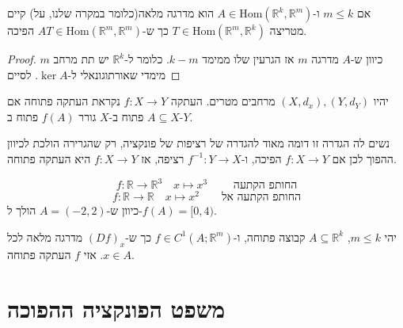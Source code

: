 \documentclass{tstextbook}
\begin{document}
\begin{lemma}
אם \(m\leq k\) ו-\(A\in\mathrm{Hom}\left( \mathbb{R}^k,\mathbb{R}^m \right)\) הוא מדרגה מלאה(כלומר במקרה שלנו, על) קיים מטריצה \(T\in\mathrm{Hom}\left( \mathbb{R}^m,\mathbb{R}^k \right)\) כך ש-\(AT\in\mathrm{Hom}\left( \mathbb{R}^m,\mathbb{R}^m \right)\) הפיכה.

\end{lemma}
\begin{proof}
כיוון ש-\(A\) מדרגה \(m\) אז הגרעין שלו ממימד \(k-m\). כלומר ל-\(\mathbb{R}^k\) יש תת מרחב \(m\) מימדי שאורתוגונאלי ל-\(\ker A\).
לסיים

\end{proof}
\begin{definition}
יהיו \((X,d_{x}),(Y,d_{Y})\) מרחבים מטרים. העתקה \(f:X\to Y\) נקראת העתקה פתוחה
אם \(A\subseteq X\) פתוח ב-\(X\) גורר \(f(A)\) פתוח ב-\(Y\).

\end{definition}
\begin{remark}
נשים לה הגדרה זו דומה מאוד להגדרה של רציפות של פונקציה, רק שהגרירה הולכת לכיוון ההפוך לכן אם \(f:X\to Y\) הפיכה, ו-\(f^{-1}:Y\to X\) רציפה, אז \(f:X\to Y\) היא העתקה פתוחה.

\end{remark}
\begin{example}
$$f:\mathbb{R}\to \mathbb{R}^3\quad x\mapsto x^3\qquad  \text{ החותפ הקתעה}$$$$f:\mathbb{R}\to\mathbb{R}\quad x\mapsto x^2 \qquad \text{החותפ הקתעה אל}$$
כיוון ש-\(A=(-2,2)\) הולך ל-\(f(A)=[0,4)\).

\end{example}
\begin{theorem}
יהי \(m\leq k\), \(A\subseteq \mathbb{R}^k\) קבוצה פתוחה, ו-\(f\in C^1\left( A;\mathbb{R}^m \right)\) כך ש-\((Df)_{x}\) מדרגה מלאה לכל \(x \in A\). אזי \(f\) העתקה פתוחה.

\end{theorem}
\section{משפט הפונקציה ההפוכה}
\end{document}
